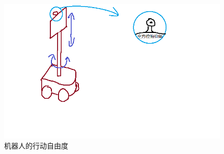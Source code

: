 \begin{figure}[h] 
        \begin{center}
                \includegraphics[width= \figwidth]{Figures/ch5.cfp.png}
        \end{center}
        \caption[机器人自由度]{机器人的行动自由度}
        \label{fig:tactile_circuit}  




\end{figure}

